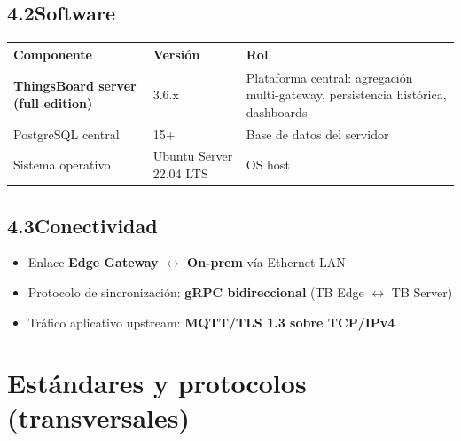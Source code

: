 \documentclass[11pt,a4paper]{article}
\newcommand{\tabhead}[1]{\textbf{\color{accentBlue!80!black}#1}}
\begin{document}
\subsection*{4.2\quad Software}
\noindent\begin{tabularx}{\linewidth}{L{4.4cm} L{2.2cm} Y}
\toprule
\tabhead{Componente} & \tabhead{Versión} & \tabhead{Rol} \\
\midrule
\textbf{ThingsBoard server (full edition)} & 3.6.x & Plataforma central: agregación multi-gateway, persistencia histórica, dashboards \\
PostgreSQL central & 15+ & Base de datos del servidor \\
Sistema operativo & Ubuntu Server 22.04 LTS & OS host \\
\bottomrule
\end{tabularx}

\subsection*{4.3\quad Conectividad}
\begin{itemize}[leftmargin=*,nosep]
\item Enlace \textbf{Edge Gateway $\leftrightarrow$ On-prem} vía Ethernet LAN
\item Protocolo de sincronización: \textbf{gRPC bidireccional} (TB Edge $\leftrightarrow$ TB Server)
\item Tráfico aplicativo upstream: \textbf{MQTT/TLS 1.3 sobre TCP/IPv4}
\end{itemize}

\section{Estándares y protocolos (transversales)}
\end{document}
